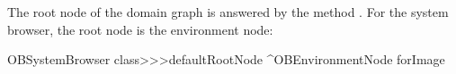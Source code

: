 \documentclass[a4paper,10pt,twoside]{book}
\begin{document}
The root node of the domain graph is answered by the method . For the system browser, the root node is the environment node:

\begin{code}{}
OBSystemBrowser class>>>defaultRootNode
	^OBEnvironmentNode forImage
\end{code}





\end{document}
